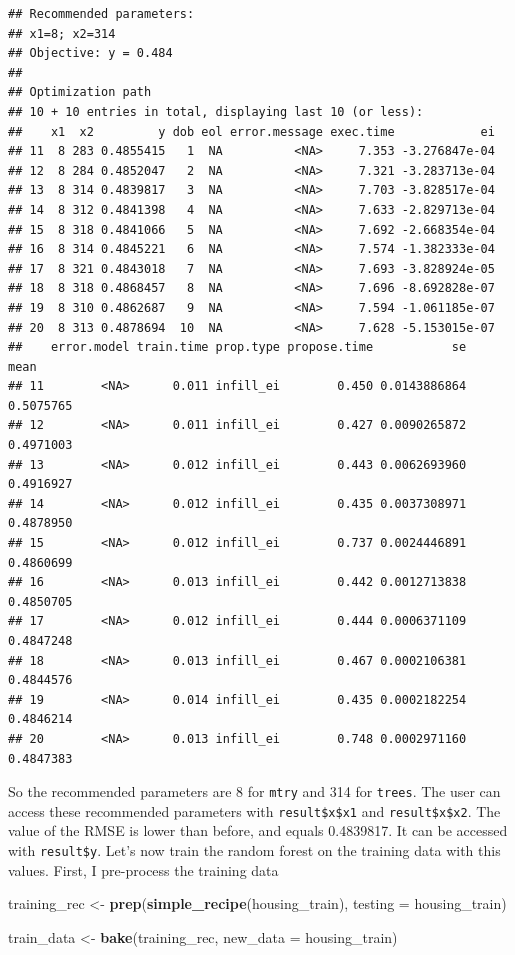 \documentclass[]{gitbook}
\newenvironment{Shaded}{\begin{snugshade}}{\end{snugshade}}
\newcommand{\DataTypeTok}[1]{\textcolor[rgb]{0.13,0.29,0.53}{#1}}
\newcommand{\KeywordTok}[1]{\textcolor[rgb]{0.13,0.29,0.53}{\textbf{#1}}}
\newcommand{\NormalTok}[1]{#1}
\newcommand{\StringTok}[1]{\textcolor[rgb]{0.31,0.60,0.02}{#1}}
\begin{document}
\begin{verbatim}
## Recommended parameters:
## x1=8; x2=314
## Objective: y = 0.484
## 
## Optimization path
## 10 + 10 entries in total, displaying last 10 (or less):
##    x1  x2         y dob eol error.message exec.time            ei
## 11  8 283 0.4855415   1  NA          <NA>     7.353 -3.276847e-04
## 12  8 284 0.4852047   2  NA          <NA>     7.321 -3.283713e-04
## 13  8 314 0.4839817   3  NA          <NA>     7.703 -3.828517e-04
## 14  8 312 0.4841398   4  NA          <NA>     7.633 -2.829713e-04
## 15  8 318 0.4841066   5  NA          <NA>     7.692 -2.668354e-04
## 16  8 314 0.4845221   6  NA          <NA>     7.574 -1.382333e-04
## 17  8 321 0.4843018   7  NA          <NA>     7.693 -3.828924e-05
## 18  8 318 0.4868457   8  NA          <NA>     7.696 -8.692828e-07
## 19  8 310 0.4862687   9  NA          <NA>     7.594 -1.061185e-07
## 20  8 313 0.4878694  10  NA          <NA>     7.628 -5.153015e-07
##    error.model train.time prop.type propose.time           se      mean
## 11        <NA>      0.011 infill_ei        0.450 0.0143886864 0.5075765
## 12        <NA>      0.011 infill_ei        0.427 0.0090265872 0.4971003
## 13        <NA>      0.012 infill_ei        0.443 0.0062693960 0.4916927
## 14        <NA>      0.012 infill_ei        0.435 0.0037308971 0.4878950
## 15        <NA>      0.012 infill_ei        0.737 0.0024446891 0.4860699
## 16        <NA>      0.013 infill_ei        0.442 0.0012713838 0.4850705
## 17        <NA>      0.012 infill_ei        0.444 0.0006371109 0.4847248
## 18        <NA>      0.013 infill_ei        0.467 0.0002106381 0.4844576
## 19        <NA>      0.014 infill_ei        0.435 0.0002182254 0.4846214
## 20        <NA>      0.013 infill_ei        0.748 0.0002971160 0.4847383
\end{verbatim}

So the recommended parameters are 8 for \texttt{mtry} and 314 for \texttt{trees}. The
user can access these recommended parameters with \texttt{result\$x\$x1} and \texttt{result\$x\$x2}.
The value of the RMSE is lower than before, and equals 0.4839817. It can be accessed with
\texttt{result\$y}.
Let's now train the random forest on the training data with this values. First, I pre-process the
training data

\begin{Shaded}
\begin{Highlighting}[]
\NormalTok{training_rec <-}\StringTok{ }\KeywordTok{prep}\NormalTok{(}\KeywordTok{simple_recipe}\NormalTok{(housing_train), }\DataTypeTok{testing =}\NormalTok{ housing_train)}

\NormalTok{train_data <-}\StringTok{ }\KeywordTok{bake}\NormalTok{(training_rec, }\DataTypeTok{new_data =}\NormalTok{ housing_train)}
\end{Highlighting}
\end{Shaded}
\end{document}
